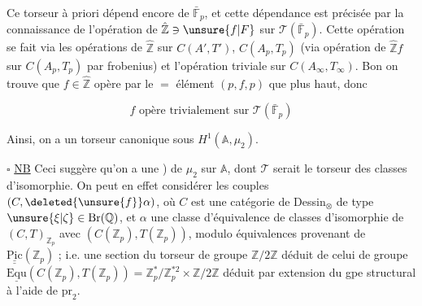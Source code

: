 
Ce torseur à priori dépend encore de $\bar{\mathbb F}_p$,  et cette
dépendance est précisée par la connaissance de l'opération
de $\hat{\mathbb Z}\ni\unsure{f|F}$ sur $\mathcal T(\bar{\mathbb F}_p)$. Cette opération se fait via
les opérations de $\hat{\mathbb Z}$ sur $C(A',T')$,   $C(A_p,T_p)$
(via opération de $\hat{\mathbb Z}f$ sur $C(A_p,T_p)$ par frobenius) et
l'opération triviale sur $C(A_\infty,T_\infty)$. Bon on trouve que
$f\in\hat{\mathbb Z}$ opère par le $=$ élément $(p,f,p)$ que plus
haut, donc

\[
f\text{ opère trivialement sur }\mathcal T(\bar{\mathbb F}_p)
\]

Ainsi, on a un torseur canonique  sous $H^1(\mathbb A,\mu_2)$.

$\square$ \uline{NB} Ceci suggère qu'on a une  
) de  $\mu_2$ sur $\mathbb A$, dont $\mathcal T$ serait
le torseur des classes d'isomorphie. On peut
en effet considérer les couples $(C,\deleted{\unsure{f}}\alpha)$, où
$C$ est une catégorie de Dessin$_\otimes$ de type $\unsure{\xi|\zeta}\in\mathrm{Br}(\mathbb Q)$,  et
$\alpha$ une  classe d'équivalence de classes d'isomorphie
de  $(C,T)_{\mathbb Z_p}$ avec $(C(\mathbb Z_p),T(\mathbb Z_p))$, modulo équivalences
provenant de $\underline{\underline{\mathrm{Pic}}}(\mathbb Z_p)$ ; i.e. une section du torseur de
groupe $\mathbb Z/2\mathbb Z$ déduit de celui de groupe $\underline{\mathrm{Equ}}(C(\mathbb Z_p),T(\mathbb Z_p))=\mathbb Z_p^*/\mathbb Z_p^{*2}\times\mathbb Z/2\mathbb Z$
déduit par extension du gpe structural à l'aide de $\mathrm{pr}_2$.


